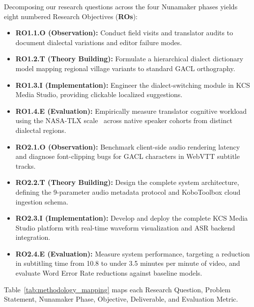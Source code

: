 \documentclass[conference]{IEEEtran}
\begin{document}
Decomposing our research questions across the four Nunamaker phases yields eight numbered Research Objectives (\textbf{ROs}):
\begin{itemize}
    \item \textbf{RO1.1.O (Observation):} Conduct field visits and translator audits to document dialectal variations and editor failure modes.
    \item \textbf{RO1.2.T (Theory Building):} Formulate a hierarchical dialect dictionary model mapping regional village variants to standard GACL orthography.
    \item \textbf{RO1.3.I (Implementation):} Engineer the dialect-switching module in KCS Media Studio, providing clickable localized suggestions.
    \item \textbf{RO1.4.E (Evaluation):} Empirically measure translator cognitive workload using the NASA-TLX scale~\cite{norman1986user} across native speaker cohorts from distinct dialectal regions.
    \item \textbf{RO2.1.O (Observation):} Benchmark client-side audio rendering latency and diagnose font-clipping bugs for GACL characters in WebVTT subtitle tracks.
    \item \textbf{RO2.2.T (Theory Building):} Design the complete system architecture, defining the 9-parameter audio metadata protocol and KoboToolbox cloud ingestion schema.
    \item \textbf{RO2.3.I (Implementation):} Develop and deploy the complete KCS Media Studio platform with real-time waveform visualization and ASR backend integration.
    \item \textbf{RO2.4.E (Evaluation):} Measure system performance, targeting a reduction in subtitling time from 10.8 to under 3.5 minutes per minute of video, and evaluate Word Error Rate reductions against baseline models.
\end{itemize}

Table~\ref{tab:methodology_mapping} maps each Research Question, Problem Statement, Nunamaker Phase, Objective, Deliverable, and Evaluation Metric.
\end{document}

